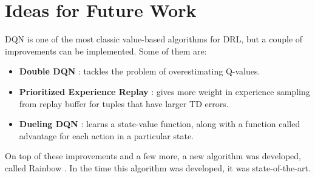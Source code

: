 \documentclass{article}
\begin{document}
\section{Ideas for Future Work}

DQN is one of the most classic value-based algorithms for DRL, but a couple of improvements can be implemented. Some of them are:

\begin{itemize}
    \item \textbf{Double DQN} \cite{hasselt2015deep}: tackles the problem of overestimating Q-values.
    \item \textbf{Prioritized Experience Replay} \cite{schaul2015prioritized}: gives more weight in experience sampling from replay buffer for tuples that have larger TD errors.
    \item \textbf{Dueling DQN} \cite{wang2015dueling}: learns a state-value function, along with a function called advantage for each action in a particular state.
\end{itemize}

On top of these improvements and a few more, a new algorithm was developed, called Rainbow \cite{hessel2017rainbow}. In the time this algorithm was developed, it was state-of-the-art.



\end{document}
